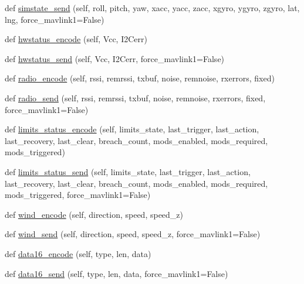 \begin{DoxyCompactItemize}
def \hyperlink{classpymavlink_1_1dialects_1_1v10_1_1MAVLink_a0f6b9b39ed82d9302c812d720682be22}{simstate\+\_\+send} (self, roll, pitch, yaw, xacc, yacc, zacc, xgyro, ygyro, zgyro, lat, lng, force\+\_\+mavlink1=False)
\item 
def \hyperlink{classpymavlink_1_1dialects_1_1v10_1_1MAVLink_aa6983e5a32446891993c593d116c0f22}{hwstatus\+\_\+encode} (self, Vcc, I2\+Cerr)
\item 
def \hyperlink{classpymavlink_1_1dialects_1_1v10_1_1MAVLink_a0902a38cacecffe0977d1dc2ccd648b4}{hwstatus\+\_\+send} (self, Vcc, I2\+Cerr, force\+\_\+mavlink1=False)
\item 
def \hyperlink{classpymavlink_1_1dialects_1_1v10_1_1MAVLink_a2ba74c3f43a84e12e97bdaa98e7e419b}{radio\+\_\+encode} (self, rssi, remrssi, txbuf, noise, remnoise, rxerrors, fixed)
\item 
def \hyperlink{classpymavlink_1_1dialects_1_1v10_1_1MAVLink_a7b76e716c0410ab62acab9d496697ea1}{radio\+\_\+send} (self, rssi, remrssi, txbuf, noise, remnoise, rxerrors, fixed, force\+\_\+mavlink1=False)
\item 
def \hyperlink{classpymavlink_1_1dialects_1_1v10_1_1MAVLink_ac21100b16bc5623f2986fb0dbe6b3160}{limits\+\_\+status\+\_\+encode} (self, limits\+\_\+state, last\+\_\+trigger, last\+\_\+action, last\+\_\+recovery, last\+\_\+clear, breach\+\_\+count, mods\+\_\+enabled, mods\+\_\+required, mods\+\_\+triggered)
\item 
def \hyperlink{classpymavlink_1_1dialects_1_1v10_1_1MAVLink_a994f9dc808c8993e2fd827e764b181a1}{limits\+\_\+status\+\_\+send} (self, limits\+\_\+state, last\+\_\+trigger, last\+\_\+action, last\+\_\+recovery, last\+\_\+clear, breach\+\_\+count, mods\+\_\+enabled, mods\+\_\+required, mods\+\_\+triggered, force\+\_\+mavlink1=False)
\item 
def \hyperlink{classpymavlink_1_1dialects_1_1v10_1_1MAVLink_a6f6a53c64878e69cc2ca4f430e6e97f4}{wind\+\_\+encode} (self, direction, speed, speed\+\_\+z)
\item 
def \hyperlink{classpymavlink_1_1dialects_1_1v10_1_1MAVLink_a4de46f5f0b6588ec1e3217f4287f439e}{wind\+\_\+send} (self, direction, speed, speed\+\_\+z, force\+\_\+mavlink1=False)
\item 
def \hyperlink{classpymavlink_1_1dialects_1_1v10_1_1MAVLink_ad87c6a1df4653a52a2e2b5770ade7fdf}{data16\+\_\+encode} (self, type, len, data)
\item 
def \hyperlink{classpymavlink_1_1dialects_1_1v10_1_1MAVLink_a6faf14de97635382c16aa181fcf9a277}{data16\+\_\+send} (self, type, len, data, force\+\_\+mavlink1=False)

\end{DoxyCompactItemize}
